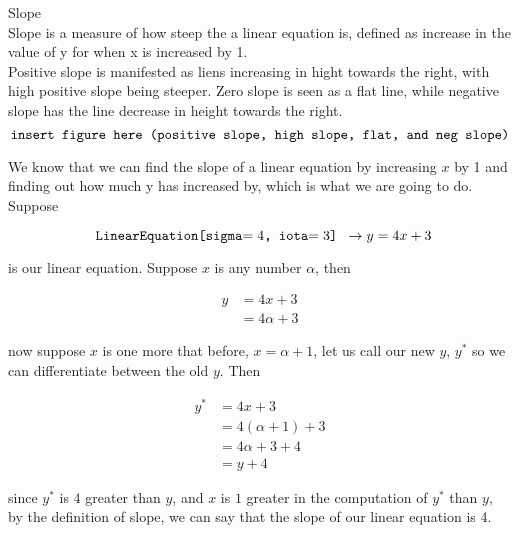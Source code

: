 \documentclass{book}
\begin{document}

  {\remark Slope \\
    Slope is a measure of how steep the a linear equation is, defined as increase in the value of y for when x is increased by 1.\\

    Positive slope is manifested as liens increasing in hight towards the right, with high positive slope being steeper. Zero slope is seen as a flat line, while negative slope has the line decrease in height towards the right.\\

    $$\text{\texttt{insert figure here (positive slope, high slope, flat, and neg slope)}}$$

    We know that we can find the slope of a linear equation by increasing $x$ by 1 and finding out how much y has increased by, which is what we are going to do. Suppose

    $$\text{\texttt{ LinearEquation[sigma$= {4}$, iota$= {3}$] }}\to y = {4}x + {3}$$

    is our linear equation. Suppose $x$ is any number $\alpha$, then

    \begin{align*}
      y & = 4x + 3\\
      & = 4 \alpha + 3
    \end{align*}

    now suppose $x$ is one more that before, $x = \alpha + 1$, let us call our new $y$, $y^*$ so we can differentiate between the old $y$. Then

    \begin{align*}
      y^* & = 4x + 3\\
      & = 4(\alpha + 1) + 3\\
      & = 4\alpha + 3 + 4\\
      & = y + 4
    \end{align*}

    since $y^*$ is $4$ greater than $y$, and $x$ is $1$ greater in the computation of $y^*$ than $y$, by the definition of slope, we can say that the slope of our linear equation is 4.\\
  }
\end{document}
